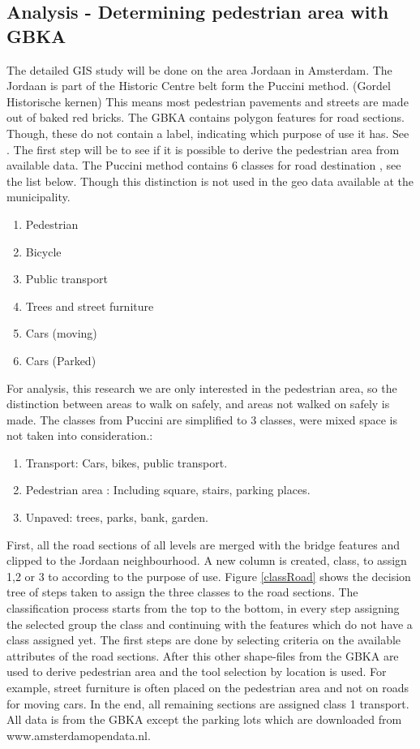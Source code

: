 \subsection{Analysis - Determining pedestrian area with GBKA}

The detailed GIS study will be done on the area Jordaan in Amsterdam. The Jordaan is part of the Historic Centre belt form the Puccini method. (Gordel Historische kernen) This means most pedestrian pavements and streets are made out of baked red bricks. \cite{puccini2014}
The GBKA contains polygon features for road sections. Though, these do not contain a label, indicating which purpose of use it has. See \cite{gbka}. The first step will be to see if it is possible to derive the pedestrian area from available data. The Puccini method contains 6 classes for road destination \cite{puccini2014}, see the list below. Though this distinction is not used in the geo data available at the municipality.

\begin{enumerate}
\item Pedestrian
\item Bicycle
\item Public transport
\item Trees and street furniture
\item Cars (moving)
\item Cars (Parked)
\end{enumerate}

For analysis, this research we are only interested in the pedestrian area, so the distinction between areas to walk on safely, and areas not walked on safely is made. The classes from Puccini are simplified to 3 classes, were mixed space is not taken into consideration.:
\begin{enumerate}
\item Transport: Cars, bikes, public transport. 
\item Pedestrian area : Including square, stairs, parking places. 
\item Unpaved: trees, parks, bank, garden.
\end{enumerate}

First, all the road sections of all levels are merged with the bridge features and clipped to the Jordaan neighbourhood. A new column is created, class, to assign 1,2 or 3 to according to the purpose of use. 
Figure \ref{classRoad} shows the decision tree of steps taken to assign the three classes to the road sections. The classification process starts from the top to the bottom, in every step assigning the selected group the class and continuing with the features which do not have a class assigned yet. The first steps are done by selecting criteria on the available attributes of the road sections. After this other shape-files from the GBKA are used to derive pedestrian area and the tool selection by location is used. For example, street furniture is often placed on the pedestrian area and not on roads for moving cars. In the end, all remaining sections are assigned class 1 transport. All data is from the GBKA except the parking lots which are downloaded from www.amsterdamopendata.nl. 

